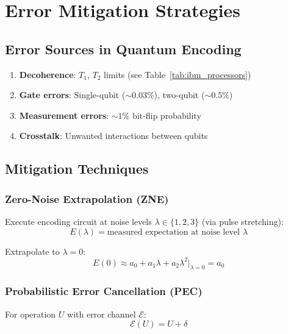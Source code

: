 \section{Error Mitigation Strategies}

\subsection{Error Sources in Quantum Encoding}

\begin{enumerate}
    \item \textbf{Decoherence}: $T_1$, $T_2$ limits (see Table~\ref{tab:ibm_processors})
    \item \textbf{Gate errors}: Single-qubit ($\sim 0.03\%$), two-qubit ($\sim 0.5\%$)
    \item \textbf{Measurement errors}: $\sim 1\%$ bit-flip probability
    \item \textbf{Crosstalk}: Unwanted interactions between qubits
\end{enumerate}

\subsection{Mitigation Techniques}

\subsubsection{Zero-Noise Extrapolation (ZNE)}

\begin{definition}
\label{def:zne_encoding}
Execute encoding circuit at noise levels $\lambda \in \{1, 2, 3\}$ (via pulse stretching):
\begin{equation}
E(\lambda) = \text{measured expectation at noise level } \lambda
\end{equation}

Extrapolate to $\lambda = 0$:
\begin{equation}
E(0) \approx a_0 + a_1 \lambda + a_2 \lambda^2 \Big|_{\lambda=0} = a_0
\end{equation}
\end{definition}

\subsubsection{Probabilistic Error Cancellation (PEC)}

For operation $U$ with error channel $\mathcal{E}$:
\begin{equation}
\mathcal{E}(U) = U + \delta
\end{equation}

